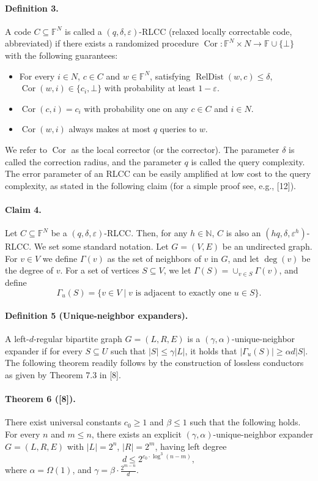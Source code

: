 \documentclass[10pt,a4paper]{article}
\begin{document}
\paragraph{Definition 3.} A code $C\subseteq\mathbb F^N$ is called a $(q,\delta,\varepsilon)$-RLCC (relaxed locally correctable code, abbreviated) if there exists a randomized procedure $\operatorname{Cor}:\mathbb F^N\times N\to\mathbb F\cup\{\bot\}$ with the following guarantees:
\begin{itemize}
\item For every $i\in N$, $c\in C$ and $w\in\mathbb F^N$, satisfying $\operatorname{RelDist}(w,c)\le\delta$, $\operatorname{Cor}(w,i)\in\{c_i,\bot\}$ with probability at least $1-\varepsilon$.
\item $\operatorname{Cor}(c,i)=c_i$ with probability one on any $c\in C$ and $i\in N$.
\item $\operatorname{Cor}(w,i)$ always makes at most $q$ queries to $w$.
\end{itemize}
We refer to $\operatorname{Cor}$ as the local corrector (or the corrector). The parameter $\delta$ is called the correction radius, and the parameter $q$ is called the query complexity.
The error parameter of an RLCC can be easily amplified at low cost to the query complexity, as stated in the following claim (for a simple proof see, e.g., [12]).
\paragraph{Claim 4.} Let $C\subseteq\mathbb F^N$ be a $(q,\delta,\varepsilon)$-RLCC. Then, for any $h\in\mathbb N$, $C$ is also an $(hq,\delta,\varepsilon^h)$-RLCC.
We set some standard notation. Let $G=(V,E)$ be an undirected graph. For $v\in V$ we define $\Gamma(v)$ as the set of neighbors of $v$ in $G$, and let $\deg(v)$ be the degree of $v$. For a set of vertices $S\subseteq V$, we let $\Gamma(S)=\cup_{v\in S}\Gamma(v)$, and define
\[\Gamma_u(S)=\{v\in V\mid v\text{ is adjacent to exactly one }u\in S\}.\]
\paragraph{Definition 5 (Unique-neighbor expanders).} A left-$d$-regular bipartite graph $G=(L,R,E)$ is a $(\gamma,\alpha)$-unique-neighbor expander if for every $S\subseteq U$ such that $|S|\le\gamma|L|$, it holds that $|\Gamma_u(S)|\ge\alpha d|S|$.
The following theorem readily follows by the construction of lossless conductors as given by Theorem 7.3 in [8].
\paragraph{Theorem 6 ([8]).} There exist universal constants $c_0\ge1$ and $\beta\le1$ such that the following holds. For every $n$ and $m\le n$, there exists an explicit $(\gamma,\alpha)$-unique-neighbor expander $G=(L,R,E)$ with $|L|=2^n$, $|R|=2^m$, having left degree
\[d\le2^{c_0\cdot\log^3(n-m)},\]
where $\alpha=\Omega(1)$, and $\gamma=\beta\cdot\frac{2^{m-n}}d$.
\end{document}
